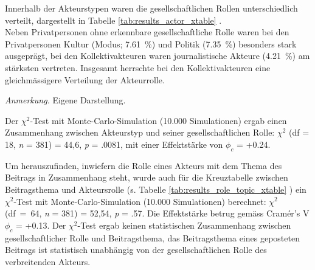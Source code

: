 \documentclass[12pt,a4paper]{article}        %
\begin{document}
Innerhalb der Akteurstypen waren die gesellschaftlichen Rollen unterschiedlich verteilt, dargestellt in Tabelle \ref{tab:results_actor_xtable} .\\
Neben Privatpersonen ohne erkennbare gesellschaftliche Rolle waren bei den Privatpersonen Kultur (Modus; 7.61 \%) und Politik (7.35 \%) besonders stark ausgeprägt, bei den Kollektivakteuren waren journalistische Akteure (4.21 \%) am stärksten vertreten. Insgesamt herrschte bei den Kollektivakteuren eine gleichmässigere Verteilung der Akteurrolle.
\begin{table}[H]
    \centering
\caption{Kreuztabelle zwischen Akteurstyp und gesellschaftlicher Rolle}
\label{tab:results_actor_xtable}
    \footnotesize\textit{Anmerkung.} Eigene Darstellung.
\end{table}

Der \(\chi^2\)-Test mit Monte-Carlo-Simulation (10.000 Simulationen) ergab einen Zusammenhang zwischen Akteurstyp und seiner gesellschaftlichen Rolle: \(\chi^2\) (df = 18, \textit{n} = 381) = 44,6, \textit{p} = .0081, mit einer Effektstärke von \(\phi_c\) = +0.24. 

Um herauszufinden, inwiefern die Rolle eines Akteurs mit dem Thema des Beitrags in Zusammenhang steht, wurde auch für die Kreuztabelle zwischen Beitragsthema und Akteursrolle (s. Tabelle \ref{tab:results_role_topic_xtable} ) ein \(\chi^2\)-Test mit Monte-Carlo-Simulation (10.000 Simulationen) berechnet:  \(\chi^2\) (df = 64, \textit{n} = 381) = 52,54, \textit{p} = .57. Die Effektstärke betrug gemäss Cramér's V \(\phi_c\) = +0.13. Der \(\chi^2\)-Test ergab keinen statistischen Zusammenhang zwischen gesellschaftlicher Rolle und Beitragsthema, das Beitragsthema eines geposteten Beitrags ist statistisch unabhängig von der gesellschaftlichen Rolle des verbreitenden Akteurs.
\end{document}
